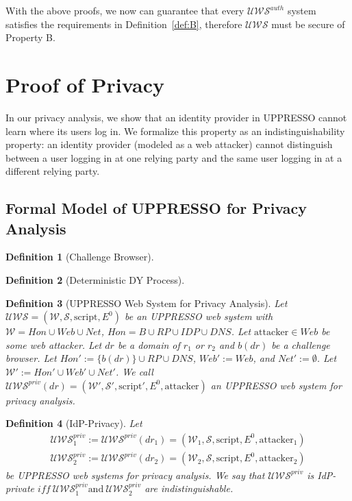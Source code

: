 \documentclass[letterpaper,onecolumn,10pt]{article}
\newtheorem{definition}{Definition}
\begin{document}
With the above proofs, we now can guarantee that every $\mathcal{U\!W\!S}^{auth}$ system satisfies the requirements in Definition~\ref{def:B}, therefore $\mathcal{U\!W\!S}$ must be secure of Property B.

\section{Proof of Privacy}

In our privacy analysis, we show that an identity provider in UPPRESSO cannot learn where its users log in. We formalize this property as an indistinguishability property: an identity provider (modeled as a web attacker) cannot distinguish between a user logging in at one relying party and the same user logging in at a different relying party.

\subsection{Formal Model of UPPRESSO for Privacy Analysis}

\begin{definition}[Challenge Browser]
\end{definition}

\begin{definition}[Deterministic DY Process]
\end{definition}

\begin{definition}[UPPRESSO Web System for Privacy Analysis]
  Let $\mathcal{U\!W\!S}=(\mathcal{W},\mathcal{S},\text{script},E^0)$ be an UPPRESSO web system with $\mathcal{W}=H\!on\cup W\!eb\cup N\!et$, $H\!on=B\cup R\!P\cup I\!D\!P\cup D\!N\!S$.
  Let $\text{attacker}\in W\!eb$ be some web attacker.
  Let $dr$ be a domain of $r_1$ or $r_2$ and $b(dr)$ be a challenge browser.
  Let $H\!on\prime := \{b(dr)\}\cup R\!P\cup D\!N\!S$, $W\!eb\prime := W\!eb$, and $N\!et\prime := \emptyset$.
  Let $\mathcal{W}\prime := H\!on\prime\cup W\!eb\prime\cup N\!et\prime$.
  We call $\mathcal{U\!W\!S}^{priv}(dr)=(\mathcal{W}\prime,\mathcal{S}\prime,\text{script}\prime,E^0,\text{attacker})$ an UPPRESSO web system for privacy analysis.
\end{definition}
  
\begin{definition}[IdP-Privacy] Let
  \begin{equation}
    \begin{aligned}
      \mathcal{U\!W\!S}^{priv}_1:=\mathcal{U\!W\!S}^{priv}(dr_1)=(\mathcal{W}_1,\mathcal{S},\text{script},E^0,\text{attacker}_1)\\
      \mathcal{U\!W\!S}^{priv}_2:=\mathcal{U\!W\!S}^{priv}(dr_2)=(\mathcal{W}_2,\mathcal{S},\text{script},E^0,\text{attacker}_2)
    \end{aligned}
  \end{equation}
  be UPPRESSO web systems for privacy analysis. 
  We say that $\mathcal{U\!W\!S}^{priv}$ is IdP-private $i\!f\!f\ \mathcal{U\!W\!S}^{priv}_1 \text{and}\ \mathcal{U\!W\!S}^{priv}_2$ are indistinguishable.
\end{definition}
\end{document}
